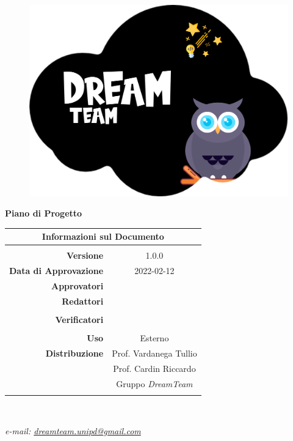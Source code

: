 
\begin{center}

\begin{figure}
\centering
\includegraphics[scale=0.05]{Sezioni/images/DreamTeam.png} 
\end{figure}

{\Huge{\textbf{Piano di Progetto}}} \\ [1cm]

\begin{table}[htbp]
\centering
\begin{tabular}{r|c}
\multicolumn{2}{c}{\textbf{Informazioni sul Documento}} \\
\hline \\
\textbf{Versione} & 1.0.0 \\ \rule{0pt}{3ex}    
\textbf{Data di Approvazione} & 2022-02-12 \\ \rule{0pt}{3ex}    
\textbf{Approvatori} & \GC{} \\ \rule{0pt}{3ex}      
\textbf{Redattori} & \MB{} \\ \rule{0pt}{2ex}   
& \EP{} \\ \rule{0pt}{3ex}    
\textbf{Verificatori} & \FP{} \\ \rule{0pt}{2ex}   
& \MG{} \\ \rule{0pt}{3ex}      
\textbf{Uso} & Esterno \\ \rule{0pt}{3ex}    
\textbf{Distribuzione} & Prof. Vardanega Tullio \\ \rule{0pt}{2ex}   
& Prof. Cardin Riccardo \\ \rule{0pt}{2ex}   
& Gruppo \textit{DreamTeam} \\ \rule{0pt}{0.1cm}   
\end{tabular} \\ [0.5cm]
\end{table}

\textsl{ e-mail: \href{mailto:dreamteam.unipd@gmail.com}{dreamteam.unipd@gmail.com} } \\[2cm]
\end{center}
\pagebreak